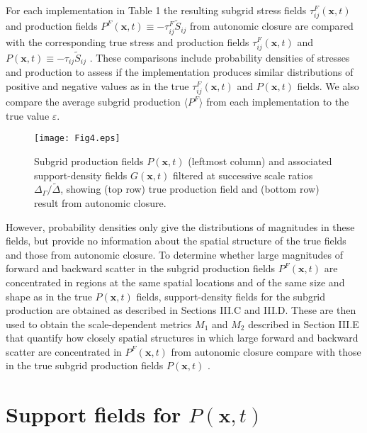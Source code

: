 For each implementation in Table 1 the resulting subgrid stress fields  $\tau_{ij}^{F}(\mathbf{x},t)$   and production fields $P^{F}(\mathbf{x},t) \equiv -\tau_{ij}^{F} \widetilde{S}_{ij}$ from autonomic closure are compared with the corresponding true stress and production fields  $\tau_{ij}^{F}(\mathbf{x},t)$  and $P(\mathbf{x},t) \equiv -\tau_{ij} \widetilde{S}_{ij}$  . These comparisons include probability densities of stresses and production to assess if the implementation produces similar distributions of positive and negative values as in the true $\tau_{ij}^{F}(\mathbf{x},t)$  and  $P(\mathbf{x},t)$ fields. We also compare the average subgrid production $\langle P^F \rangle$  from each implementation to the true value $\varepsilon$.

%
\begin{figure}
	\begin{center}
	\texttt{[image: Fig4.eps]}
	\caption{ Subgrid production fields $P(\mathbf{x},t)$ (leftmost column) and associated support-density fields $G(\mathbf{x},t)$ filtered at successive scale ratios $\Delta_{\Gamma}/\widetilde{\Delta}$, showing (top row) true production field and (bottom row) result from autonomic closure. }
	\label{F:4}
	\end{center}
\end{figure}
%
%


However, probability densities only give the distributions of magnitudes in these fields, but provide no information about the spatial structure of the true fields and those from autonomic closure. To determine whether large magnitudes of forward and backward scatter in the subgrid production fields $P^{F}(\mathbf{x},t)$  are concentrated in regions at the same spatial locations and of the same size and shape as in the true $P(\mathbf{x},t)$  fields, support-density fields for the subgrid production are obtained as described in Sections III.C and III.D. These are then used to obtain the scale-dependent metrics $M_1$  and $M_2$  described in Section III.E that quantify how closely spatial structures in which large forward and backward scatter are concentrated in $P^{F}(\mathbf{x},t)$  from autonomic closure compare with those in the true subgrid production fields $P(\mathbf{x},t)$ .


\section{Support fields for $P(\mathbf{x},t)$} 

